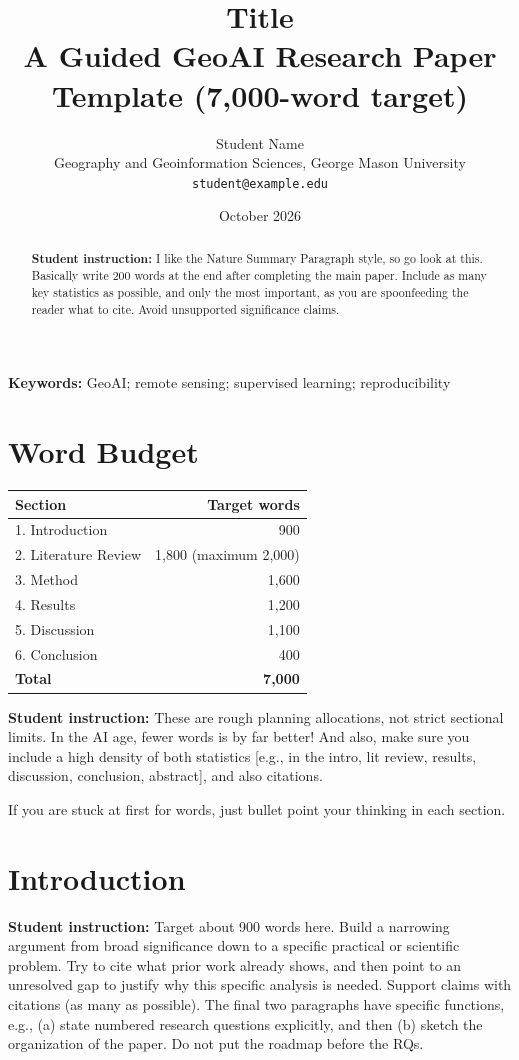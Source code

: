 \documentclass[11pt,letterpaper]{article}
\title{Title\\\large
A Guided GeoAI Research Paper Template (7,000-word target)}
\author{Student Name\\Geography and Geoinformation Sciences, George Mason
University\\\texttt{student@example.edu}}
\date{October 2026}
\newcommand{\guide}[1]{\par\begingroup\color{blue!60!black}\small\textbf{Student
instruction:} #1\par\endgroup}
\begin{document}
\maketitle
\begin{center}\end{center}
\begin{abstract}
\guide{I like the Nature Summary Paragraph style, so go look at this. 
Basically write 200 words at the end after completing the main paper. 
Include as many key statistics as possible, and only the most important, as you are spoonfeeding the reader what to cite. 
Avoid unsupported significance claims.}
\end{abstract}
\textbf{Keywords:} GeoAI; remote sensing; supervised learning; reproducibility
\section*{Word Budget}
\begin{center}\begin{tabular}{lr}\toprule Section & Target words \\\midrule
1. Introduction & 900\\
2. Literature Review & 1,800 (maximum 2,000)\\
3. Method & 1,600\\
4. Results & 1,200\\
5. Discussion & 1,100\\
6. Conclusion & 400\\\midrule
\textbf{Total} & \textbf{7,000}\\\bottomrule\end{tabular}\end{center}
\guide{These are rough planning allocations, not strict sectional limits. In the AI age, fewer words is by far better!
And also, make sure you include a high density of both statistics [e.g., in the intro, lit review, results, 
discussion, conclusion, abstract], and also citations. 

If you are stuck at first for words, just bullet point your thinking in each section.
}

\section{Introduction}
\guide{Target about 900 words here. Build a narrowing argument from broad significance
down to a specific practical or scientific problem. Try to cite what prior work already shows, and
then point to an unresolved gap to justify why this specific analysis is needed. Support
claims with citations (as many as possible). The final two paragraphs have specific functions, e.g., (a) state
numbered research questions explicitly, and then (b) sketch the organization of the paper. Do not
put the roadmap before the RQs.}
\end{document}
